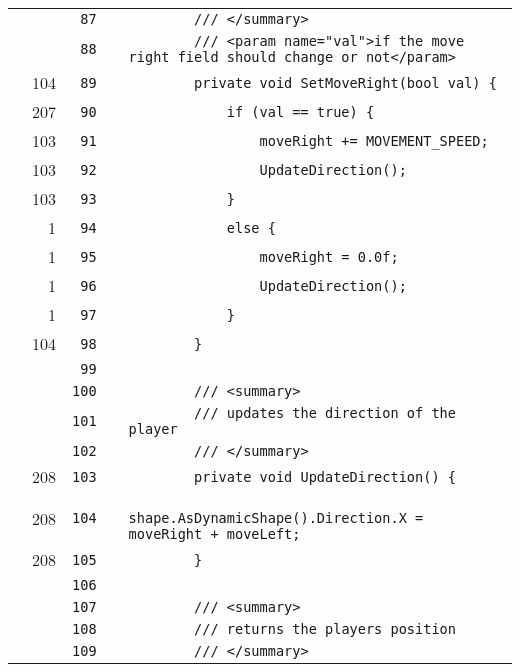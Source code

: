\documentclass[a4paper,landscape,10pt]{article}
\begin{document}
\begin{longtable}[l]{lrrll}
\cellcolor{gray} &  & \verb~87~ & & \verb~        /// </summary>~\\
\cellcolor{gray} &  & \verb~88~ & & \verb~        /// <param name="val">if the move right field should change or not</param>~\\
\cellcolor{green} & 104 & \verb~89~ & & \verb~        private void SetMoveRight(bool val) {~\\
\cellcolor{green} & 207 & \verb~90~ & & \verb~            if (val == true) {~\\
\cellcolor{green} & 103 & \verb~91~ & & \verb~                moveRight += MOVEMENT_SPEED;~\\
\cellcolor{green} & 103 & \verb~92~ & & \verb~                UpdateDirection();~\\
\cellcolor{green} & 103 & \verb~93~ & & \verb~            }~\\
\cellcolor{green} & 1 & \verb~94~ & & \verb~            else {~\\
\cellcolor{green} & 1 & \verb~95~ & & \verb~                moveRight = 0.0f;~\\
\cellcolor{green} & 1 & \verb~96~ & & \verb~                UpdateDirection();~\\
\cellcolor{green} & 1 & \verb~97~ & & \verb~            }~\\
\cellcolor{green} & 104 & \verb~98~ & & \verb~        }~\\
\cellcolor{gray} &  & \verb~99~ & & \verb~~\\
\cellcolor{gray} &  & \verb~100~ & & \verb~        /// <summary>~\\
\cellcolor{gray} &  & \verb~101~ & & \verb~        /// updates the direction of the player~\\
\cellcolor{gray} &  & \verb~102~ & & \verb~        /// </summary>~\\
\cellcolor{green} & 208 & \verb~103~ & & \verb~        private void UpdateDirection() {~\\
\cellcolor{green} & 208 & \verb~104~ & & \verb~            shape.AsDynamicShape().Direction.X = moveRight + moveLeft;~\\
\cellcolor{green} & 208 & \verb~105~ & & \verb~        }~\\
\cellcolor{gray} &  & \verb~106~ & & \verb~~\\
\cellcolor{gray} &  & \verb~107~ & & \verb~        /// <summary>~\\
\cellcolor{gray} &  & \verb~108~ & & \verb~        /// returns the players position~\\
\cellcolor{gray} &  & \verb~109~ & & \verb~        /// </summary>~\\

\end{longtable}
\end{document}
